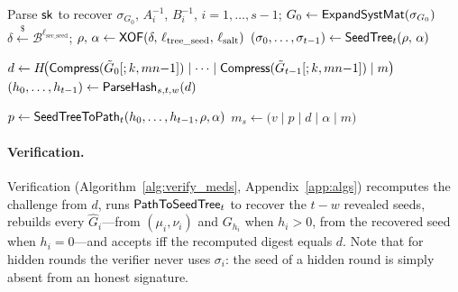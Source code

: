 \begin{algorithm}[tb]
\footnotesize
\setlength{\algomargin}{0.9em}
\caption{MEDS signing (simplified).}
\label{alg:sign_meds}

Parse $\mathsf{sk}$ to recover $\sigma_{G_0}$, $A_i^{-1}$, $B_i^{-1}$, $i=1,\ldots,s-1$;\quad
$G_0 \leftarrow \mathsf{ExpandSystMat}(\sigma_{G_0})$\;
$\delta \xleftarrow{\$} \mathcal{B}^{\ell_{\mathrm{sec\_seed}}}$;\quad
$\rho,\, \alpha \leftarrow \mathsf{XOF}(\delta,\, \ell_{\mathrm{tree\_seed}},\, \ell_{\mathrm{salt}})$\;
$(\sigma_0, \ldots, \sigma_{t-1}) \leftarrow \mathsf{SeedTree}_t(\rho,\, \alpha)$\label{alg:meds:tree}


$d \leftarrow H\!\bigl(\mathsf{Compress}(\tilde{G}_0[;k,mn{-}1]) \mid \cdots \mid \mathsf{Compress}(\tilde{G}_{t-1}[;k,mn{-}1]) \mid m\bigr)$\;
$(h_0,\ldots,h_{t-1}) \leftarrow \mathsf{ParseHash}_{s,t,w}(d)$


$p \leftarrow \mathsf{SeedTreeToPath}_t(h_0,\ldots,h_{t-1},\rho,\alpha)$\label{alg:meds:path}
\Return $m_s \leftarrow \bigl(v \mid p \mid d \mid \alpha \mid m\bigr)$
\end{algorithm}

\paragraph{Verification.}
Verification (Algorithm~\ref{alg:verify_meds}, Appendix~\ref{app:algs})
recomputes the challenge from $d$, runs $\mathsf{PathToSeedTree}_t$ to recover the
$t-w$ revealed seeds, rebuilds every $\hat{G}_i$---from $(\mu_i,\nu_i)$ and
$G_{h_i}$ when $h_i > 0$, from the recovered seed when $h_i = 0$---and accepts
iff the recomputed digest equals $d$. Note that for hidden rounds the verifier
never uses $\sigma_i$: the seed of a hidden round is simply absent from an
honest signature.

